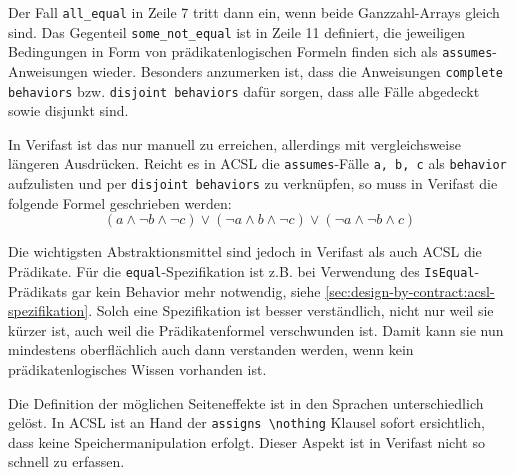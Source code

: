 

Der Fall \lstinline{all_equal} in Zeile 7 tritt dann ein, wenn beide Ganzzahl-Arrays gleich sind. Das 
Gegenteil \lstinline{some_not_equal} ist in Zeile 11 definiert, die jeweiligen Bedingungen in Form von
prädikatenlogischen Formeln finden sich als \lstinline{assumes}-Anweisungen wieder. Besonders anzumerken ist,
dass die Anweisungen \lstinline{complete behaviors} bzw. \lstinline{disjoint behaviors} dafür sorgen, dass
alle Fälle abgedeckt sowie disjunkt sind.

In Verifast ist das nur manuell zu erreichen, allerdings mit vergleichsweise längeren Ausdrücken. Reicht 
es in ACSL die \lstinline{assumes}-Fälle \lstinline{a, b, c} als \lstinline{behavior} 
aufzulisten und per \lstinline{disjoint behaviors} zu verknüpfen, so muss in Verifast die folgende
Formel geschrieben werden:
\[(a \land \neg b \land \neg c) \lor (\neg a \land b \land \neg c) \lor (\neg a \land \neg b \land c)\]

Die wichtigsten Abstraktionsmittel sind jedoch in Verifast als auch ACSL die Prädikate. 
Für die \lstinline{equal}-Spezifikation ist z.B. bei Verwendung des \lstinline{IsEqual}-Prädikats gar kein Behavior mehr notwendig,
siehe \ref{sec:design-by-contract:acsl-spezifikation}. Solch eine Spezifikation ist besser 
verständlich, nicht nur weil sie kürzer ist, auch weil die Prädikatenformel verschwunden ist. 
Damit kann sie nun mindestens oberflächlich auch dann verstanden werden, wenn kein 
prädikatenlogisches Wissen vorhanden ist.

Die Definition der möglichen Seiteneffekte ist in den Sprachen unterschiedlich gelöst. In ACSL
ist an Hand der \lstinline{assigns \nothing} Klausel sofort ersichtlich, dass keine Speichermanipulation
erfolgt. Dieser Aspekt ist in Verifast nicht so schnell zu erfassen.

